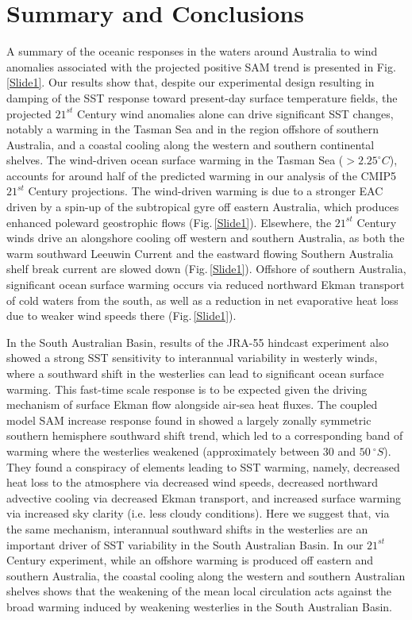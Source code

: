 \documentclass[draft,linenumbers]{agujournal2018}
\begin{document}
\section{Summary and Conclusions}
A summary of the oceanic responses in the waters around Australia to wind anomalies associated with the projected positive SAM trend is presented in Fig.\,\ref{Slide1}. Our results show that, despite our experimental design resulting in damping of the SST response toward present-day surface temperature fields, the projected $21^{st}$ Century wind anomalies alone can drive significant SST changes, notably a warming in the Tasman Sea and in the region offshore of southern Australia, and a coastal cooling along the western and southern continental shelves. The wind-driven ocean surface warming in the Tasman Sea ($> 2.25 ^{\circ}C$), accounts for around half of the predicted warming in our analysis of the CMIP5 $21^{st}$ Century projections. The wind-driven warming is due to a stronger EAC driven by a spin-up of the subtropical gyre off eastern Australia, which produces enhanced poleward geostrophic flows (Fig.\,\ref{Slide1}). Elsewhere, the $21^{st}$ Century winds drive an alongshore cooling off western and southern Australia, as both the warm southward Leeuwin Current and the eastward flowing Southern Australia shelf break current are slowed down (Fig.\,\ref{Slide1}). Offshore of southern Australia, significant ocean surface warming occurs via reduced northward Ekman transport of cold waters from the south, as well as a reduction in net evaporative heat loss due to weaker wind speeds there (Fig.\,\ref{Slide1}).

In the South Australian Basin, results of the JRA-55 hindcast experiment also showed a strong SST sensitivity to interannual variability in westerly winds, where a southward shift in the westerlies can lead to significant ocean surface warming. This fast-time scale response is to be expected given the driving mechanism of surface Ekman flow alongside air-sea heat fluxes. The coupled model SAM increase response found in \citet{SenGupta2006} showed a largely zonally symmetric southern hemisphere southward shift trend, which led to a corresponding band of warming where the westerlies weakened (approximately between $30$ and $50\ ^{\circ}S$). They found a conspiracy of elements leading to SST warming, namely, decreased heat loss to the atmosphere via decreased wind speeds, decreased northward advective cooling via decreased Ekman transport, and increased surface warming via increased sky clarity (i.e. less cloudy conditions). Here we suggest that, via the same mechanism, interannual southward shifts in the westerlies are an important driver of SST variability in the South Australian Basin. In our $21^{st}$ Century experiment, while an offshore warming is produced off eastern and southern Australia, the coastal cooling along the western and southern Australian shelves shows that the weakening of the mean local circulation acts against the broad warming induced by weakening westerlies in the South Australian Basin.
\end{document}
